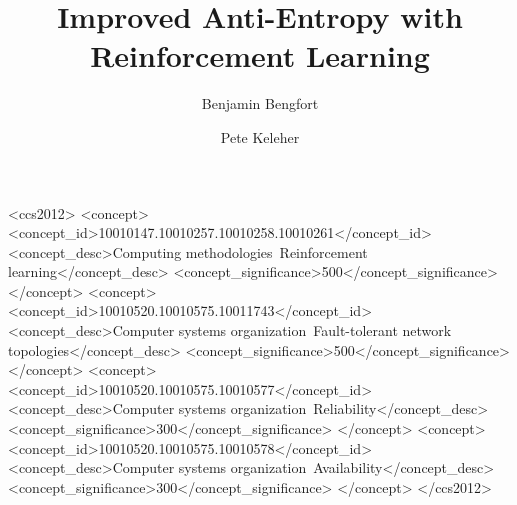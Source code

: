 \documentclass[sigconf, authordraft]{acmart}
\begin{document}
\title{Improved Anti-Entropy with Reinforcement Learning}

\author{Benjamin Bengfort}

\author{Pete Keleher}

\begin{abstract}
    
\end{abstract}

%
%
\begin{CCSXML}
<ccs2012>
<concept>
<concept_id>10010147.10010257.10010258.10010261</concept_id>
<concept_desc>Computing methodologies~Reinforcement learning</concept_desc>
<concept_significance>500</concept_significance>
</concept>
<concept>
<concept_id>10010520.10010575.10011743</concept_id>
<concept_desc>Computer systems organization~Fault-tolerant network topologies</concept_desc>
<concept_significance>500</concept_significance>
</concept>
<concept>
<concept_id>10010520.10010575.10010577</concept_id>
<concept_desc>Computer systems organization~Reliability</concept_desc>
<concept_significance>300</concept_significance>
</concept>
<concept>
<concept_id>10010520.10010575.10010578</concept_id>
<concept_desc>Computer systems organization~Availability</concept_desc>
<concept_significance>300</concept_significance>
</concept>
</ccs2012>
\end{CCSXML}





\maketitle



% 

\end{document}
